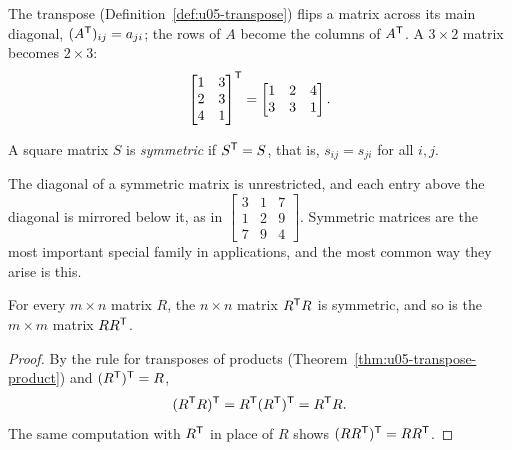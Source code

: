 The transpose (Definition~\ref{def:u05-transpose}) flips a matrix across its main diagonal,
$(A^{\mathsf{T}})_{ij}=a_{ji}$; the rows of $A$ become the columns of $A^{\mathsf{T}}$. A $3\times2$ matrix becomes
$2\times3$:
\[
  \begin{bmatrix} 1&3\\ 2&3\\ 4&1\end{bmatrix}^{\mathsf{T}}=\begin{bmatrix} 1&2&4\\ 3&3&1\end{bmatrix}.
\]

\begin{definition}\label{def:u06-symmetric}
A square matrix $S$ is \emph{symmetric} if $S^{\mathsf{T}}=S$, that is, $s_{ij}=s_{ji}$ for all $i,j$.
\end{definition}

The diagonal of a symmetric matrix is unrestricted, and each entry above the diagonal is
mirrored below it, as in
$\begin{bmatrix} 3&1&7\\ 1&2&9\\ 7&9&4\end{bmatrix}$. Symmetric matrices are the most
important special family in applications, and the most common way they arise is this.

\begin{theorem}[$R\T R$ is symmetric]\label{thm:u06-RTR}
For every $m\times n$ matrix $R$, the $n\times n$ matrix $R\T R$ is symmetric, and so is the
$m\times m$ matrix $RR^{\mathsf{T}}$.
\end{theorem}

\begin{proof}
By the rule for transposes of products (Theorem~\ref{thm:u05-transpose-product}) and
$(R^{\mathsf{T}})^{\mathsf{T}}=R$,
\[
  (R^{\mathsf{T}} R)^{\mathsf{T}}=R^{\mathsf{T}}(R^{\mathsf{T}})^{\mathsf{T}}=R^{\mathsf{T}} R .
\]
The same computation with $R^{\mathsf{T}}$ in place of $R$ shows $(RR^{\mathsf{T}})^{\mathsf{T}}=RR^{\mathsf{T}}$.
\end{proof}

